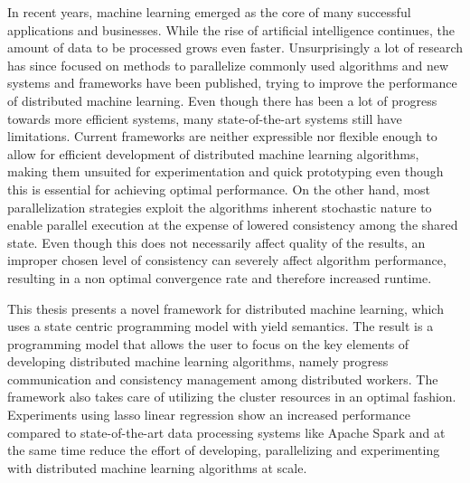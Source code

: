 % 
% 
%
In recent years, machine learning emerged as the core of many successful applications and businesses.
While the rise of artificial intelligence continues, the amount of data to be processed grows even faster.
Unsurprisingly a lot of research has since focused on methods to parallelize commonly used algorithms and new systems and frameworks have been published, trying to improve the performance of distributed machine learning.
Even though there has been a lot of progress towards more efficient systems, many state-of-the-art systems still have limitations.
Current frameworks are neither expressible nor flexible enough to allow for efficient development of distributed machine learning algorithms, making them unsuited for experimentation and quick prototyping even though this is essential for achieving optimal performance.
On the other hand, most parallelization strategies exploit the algorithms inherent stochastic nature to enable parallel execution at the expense of lowered consistency among the shared state.
Even though this does not necessarily affect quality of the results, an improper chosen level of consistency can severely affect algorithm performance, resulting in a non optimal convergence rate and therefore increased runtime.

This thesis presents a novel framework for distributed machine learning, which uses a state centric programming model with yield semantics.
The result is a programming model that allows the user to focus on the key elements of developing distributed machine learning algorithms, namely progress communication and consistency management among distributed workers.
The framework also takes care of utilizing the cluster resources in an optimal fashion.
Experiments using lasso linear regression show an increased performance compared to state-of-the-art data processing systems like Apache Spark and at the same time reduce the effort of developing, parallelizing and experimenting with distributed machine learning algorithms at scale.
